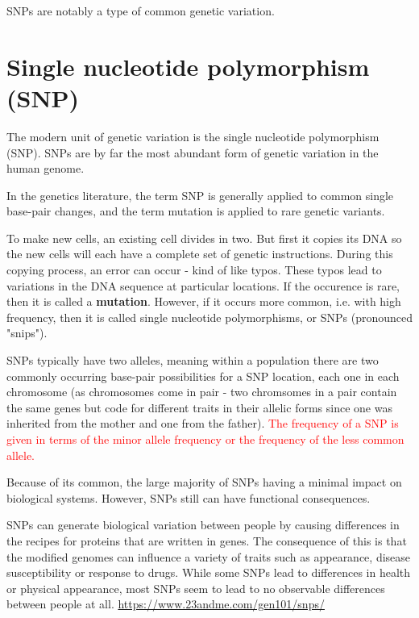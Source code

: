 SNPs are notably a type of common genetic variation.



\section{Single nucleotide polymorphism (SNP)}
\label{sec:SNP}

The modern unit of genetic variation is the single nucleotide polymorphism
(SNP). SNPs are by far the most abundant form of genetic variation in the human
genome.

\begin{mdframed}

In the genetics literature, the term SNP is generally applied to common single
base-pair changes, and the term mutation is applied to rare genetic variants.

\end{mdframed}

To make new cells, an existing cell divides in two. But first it copies its DNA
so the new cells will each have a complete set of genetic instructions.
During this copying process, an error can occur -  kind of like typos. These
typos lead to variations in the DNA sequence at particular locations.
If the occurence is rare, then it is called a {\bf mutation}. However, if it
occurs more common, i.e. with high frequency, then it is called single
nucleotide polymorphisms, or SNPs (pronounced "snips").

SNPs typically have two alleles, meaning within a population there are two
commonly occurring base-pair possibilities for a SNP location, each one in each
chromosome (as chromosomes come in pair - two chromsomes in a pair contain the
same genes but code for different traits in their allelic forms since one was
inherited from the mother and one from the father).
\textcolor{red}{The frequency of a SNP is given in terms of the minor allele
frequency or the frequency of the less common allele.}

Because of its common, the large majority of SNPs having a minimal impact on
biological systems. However, SNPs still can have functional consequences.

SNPs can generate biological variation between people by causing differences in
the recipes for proteins that are written in genes.
The consequence of this is that the modified genomes can influence a variety of
traits such as appearance, disease susceptibility or response to drugs.
While some SNPs lead to differences in health or physical appearance, most SNPs
seem to lead to no observable differences between people at all.
\url{https://www.23andme.com/gen101/snps/}

